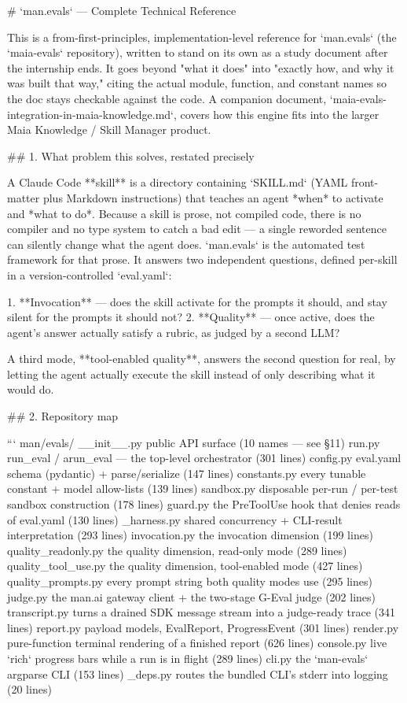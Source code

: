 # `man.evals` — Complete Technical Reference

This is a from-first-principles, implementation-level reference for `man.evals` (the `maia-evals` repository), written to stand on its own as a study document after the internship ends.
It goes beyond "what it does" into "exactly how, and why it was built that way," citing the actual module, function, and constant names so the doc stays checkable against the code.
A companion document, `maia-evals-integration-in-maia-knowledge.md`, covers how this engine fits into the larger Maia Knowledge / Skill Manager product.

## 1. What problem this solves, restated precisely

A Claude Code **skill** is a directory containing `SKILL.md` (YAML front-matter plus Markdown instructions) that teaches an agent *when* to activate and *what to do*.
Because a skill is prose, not compiled code, there is no compiler and no type system to catch a bad edit — a single reworded sentence can silently change what the agent does.
`man.evals` is the automated test framework for that prose. It answers two independent questions, defined per-skill in a version-controlled `eval.yaml`:

1. **Invocation** — does the skill activate for the prompts it should, and stay silent for the prompts it should not?
2. **Quality** — once active, does the agent's answer actually satisfy a rubric, as judged by a second LLM?

A third mode, **tool-enabled quality**, answers the second question for real, by letting the agent actually execute the skill instead of only describing what it would do.

## 2. Repository map

```
man/evals/
  __init__.py           public API surface (10 names — see §11)
  run.py                 run_eval / arun_eval — the top-level orchestrator (301 lines)
  config.py              eval.yaml schema (pydantic) + parse/serialize (147 lines)
  constants.py           every tunable constant + model allow-lists (139 lines)
  sandbox.py             disposable per-run / per-test sandbox construction (178 lines)
  guard.py               the PreToolUse hook that denies reads of eval.yaml (130 lines)
  _harness.py            shared concurrency + CLI-result interpretation (293 lines)
  invocation.py          the invocation dimension (199 lines)
  quality_readonly.py    the quality dimension, read-only mode (289 lines)
  quality_tool_use.py    the quality dimension, tool-enabled mode (427 lines)
  quality_prompts.py     every prompt string both quality modes use (295 lines)
  judge.py               the man.ai gateway client + the two-stage G-Eval judge (202 lines)
  transcript.py          turns a drained SDK message stream into a judge-ready trace (341 lines)
  report.py              payload models, EvalReport, ProgressEvent (301 lines)
  render.py              pure-function terminal rendering of a finished report (626 lines)
  console.py             live `rich` progress bars while a run is in flight (289 lines)
  cli.py                 the `man-evals` argparse CLI (153 lines)
  _deps.py               routes the bundled CLI's stderr into logging (20 lines)


